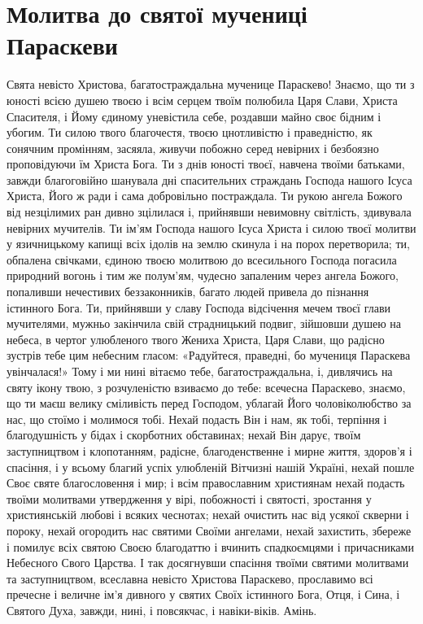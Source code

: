 \documentclass[chapters.tex]{subfiles}
\begin{document}
\section{Молитва до святої мучениці Параскеви}
Свята невісто Христова, багатостраждальна мученице Параскево! Знаємо, що ти з юності всією душею твоєю і всім серцем твоїм полюбила Царя Слави, Христа Спасителя, і Йому єдиному уневістила себе, роздавши майно своє бідним і убогим. Ти силою твого благочестя, твоєю цнотливістю і праведністю, як сонячним промінням, засяяла, живучи побожно серед невірних і безбоязно проповідуючи їм Христа Бога. Ти з днів юності твоєї, навчена твоїми батьками, завжди благоговійно шанувала дні спасительних страждань Господа нашого Ісуса Христа, Його ж ради і сама добровільно постраждала. Ти рукою ангела Божого від незцілимих ран дивно зцілилася і, прийнявши невимовну світлість, здивувала невірних мучителів. Ти ім’ям Господа нашого Ісуса Христа і силою твоєї молитви у язичницькому капищі всіх ідолів на землю скинула і на порох перетворила; ти, обпалена свічками, єдиною твоєю молитвою до всесильного Господа погасила природний вогонь і тим же полум’ям, чудесно запаленим через ангела Божого, попаливши нечестивих беззаконників, багато людей привела до пізнання істинного Бога. Ти, прийнявши у славу Господа відсічення мечем твоєї глави мучителями, мужньо закінчила свій страдницький подвиг, зійшовши душею на небеса, в чертог улюбленого твого Жениха Христа, Царя Слави, що радісно зустрів тебе цим небесним гласом: «Радуйтеся, праведні, бо мучениця Параскева увінчалася!» Тому і ми нині вітаємо тебе, багатостраждальна, і, дивлячись на святу ікону твою, з розчуленістю взиваємо до тебе: всечесна Параскево, знаємо, що ти маєш велику сміливість перед Господом, ублагай Його чоловіколюбство за нас, що стоїмо і молимося тобі. Нехай подасть Він і нам, як тобі, терпіння і благодушність у бідах і скорботних обставинах; нехай Він дарує, твоїм заступництвом і клопотанням, радісне, благоденственне і мирне життя, здоров’я і спасіння, і у всьому благий успіх улюбленій Вітчизні нашій Україні, нехай пошле Своє святе благословення і мир; і всім православним християнам нехай подасть твоїми молитвами утвердження у вірі, побожності і святості, зростання у християнській любові і всяких чеснотах; нехай очистить нас від усякої скверни і пороку, нехай огородить нас святими Своїми ангелами, нехай захистить, збереже і помилує всіх святою Своєю благодаттю і вчинить спадкоємцями і причасниками Небесного Свого Царства. І так досягнувши спасіння твоїми святими молитвами та заступництвом, всеславна невісто Христова Параскево, прославимо всі пречесне і величне ім’я дивного у святих Своїх істинного Бога, Отця, і Сина, і Святого Духа, завжди, нині, і повсякчас, і навіки-віків. Амінь.
\end{document}
